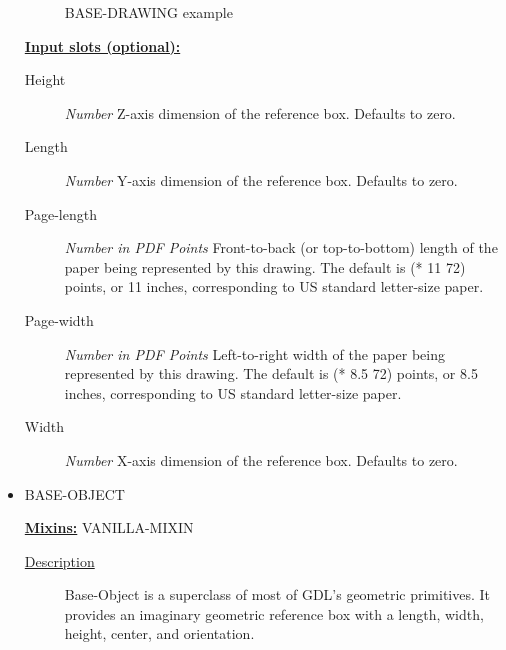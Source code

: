 \documentclass [11pt]{book}
\begin{document}
\begin{itemize}
\begin{figure}
\caption{BASE-DRAWING example}

\label{fig:BASE-DRAWING}

\end{figure}





\textbf{
\underline{Input slots (optional):}}

\begin{description}

\item [Height]
\emph{Number} Z-axis dimension of the reference box. Defaults to zero.


\item [Length]
\emph{Number} Y-axis dimension of the reference box. Defaults to zero.


\item [Page-length]
\emph{Number in PDF Points} Front-to-back (or top-to-bottom) length of the paper being represented
by this drawing. The default is (* 11 72) points, or 11 inches, corresponding to US standard
letter-size paper.


\item [Page-width]
\emph{Number in PDF Points} Left-to-right width of the paper being represented by this drawing.
The default is (* 8.5 72) points, or 8.5 inches, corresponding to US standard letter-size paper.


\item [Width]
\emph{Number} X-axis dimension of the reference box. Defaults to zero.


\end{description}







\item {}BASE-OBJECT


\textbf{
\underline{Mixins:}} VANILLA-MIXIN





\begin{description}

\item [
\underline{Description}]


Base-Object is a superclass of most of GDL's geometric primitives. It 
provides an imaginary geometric reference box with a length, width, height, center, 
and orientation.




\end{description}
\end{itemize}
\end{document}
